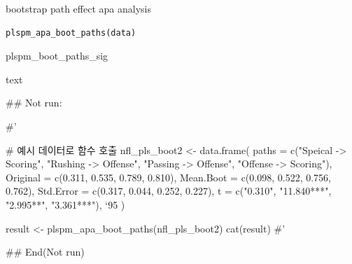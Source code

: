\documentclass[a4paper]{book}
\begin{document}
%
\begin{Description}
bootstrap path effect apa analysis
\end{Description}
%
\begin{Usage}
\begin{verbatim}
plspm_apa_boot_paths(data)
\end{verbatim}
\end{Usage}
%
\begin{Arguments}
\begin{ldescription}
\item[\code{data}] plspm\_boot\_paths\_sig
\end{ldescription}
\end{Arguments}
%
\begin{Value}
text
\end{Value}
%
\begin{Examples}
\begin{ExampleCode}

\#\# Not run: 

#'

# 예시 데이터로 함수 호출
nfl_pls_boot2 <- data.frame(
  paths = c("Speical -> Scoring", "Rushing -> Offense", "Passing -> Offense", "Offense -> Scoring"),
  Original = c(0.311, 0.535, 0.789, 0.810),
  Mean.Boot = c(0.098, 0.522, 0.756, 0.762),
  Std.Error = c(0.317, 0.044, 0.252, 0.227),
  t = c("0.310", "11.840***", "2.995**", "3.361***"),
  `95%
)

result <- plspm_apa_boot_paths(nfl_pls_boot2)
cat(result)
#'

## End(Not run)

\end{ExampleCode}
\end{Examples}
\end{document}
